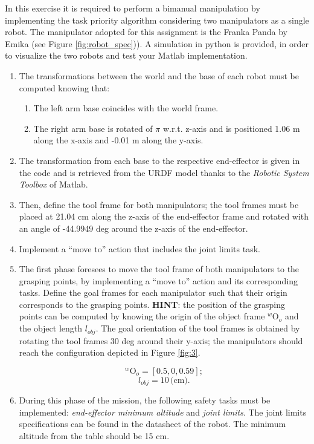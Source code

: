 \documentclass{article}
\begin{document}
In this exercise it is required to perform a bimanual manipulation by implementing the task priority algorithm considering two manipulators as a single robot. The manipulator adopted for this assignment is the Franka Panda by Emika (see Figure \ref{fig:robot_spec})). A simulation in python is provided, in order to visualize the two robots and test your Matlab implementation.

\begin{enumerate}
	\item The transformations between the world and the base of each robot must be computed knowing that: 
	\begin{enumerate}
		\item The left arm base coincides with the world frame.
		\item The right arm base is rotated of $\pi$ w.r.t. z-axis and is positioned 1.06 m along the x-axis and -0.01 m along the y-axis.
		
	\end{enumerate}

	\item The transformation from each base to the respective end-effector is given in the code and is retrieved from the URDF model thanks to the \textit{Robotic System Toolbox} of Matlab.
	
	\item Then, define the tool frame for both manipulators; the tool frames must be placed at 21.04 cm along the z-axis of the end-effector frame and rotated with an angle of -44.9949 deg around the z-axis of the end-effector.
	
	\item Implement a ``move to'' action that includes the joint limits task.
	
	
	\item The first phase foresees to move the tool frame of both manipulators to the grasping points, by implementing  a ``move to'' action and its corresponding tasks. Define the goal frames for each manipulator such that their origin corresponds to the grasping points. \textbf{HINT}: the position of the grasping points can be computed by knowing the origin of the object frame $^{w}\textrm{O}_{o}$ and the object length $l_{obj}$. The goal orientation of the tool frames is obtained by rotating the tool frames 30 deg around their y-axis; the manipulators should reach the configuration depicted in Figure \ref{fig:3}. 
	

	\begin{equation}
		^{w}\textrm{O}_{o} = [0.5, 0, 0.59];
	\end{equation}
	\begin{equation}
		l_{obj} = 10\,  \text{(cm)}.
	\end{equation}

	\item During this phase of the mission, the following safety tasks must be implemented: \textit{end-effector minimum altitude} and \textit{joint limits}. The joint limits specifications can be found in the datasheet of the robot. The minimum altitude from the table should be 15 cm. 
\end{enumerate}
\end{document}

